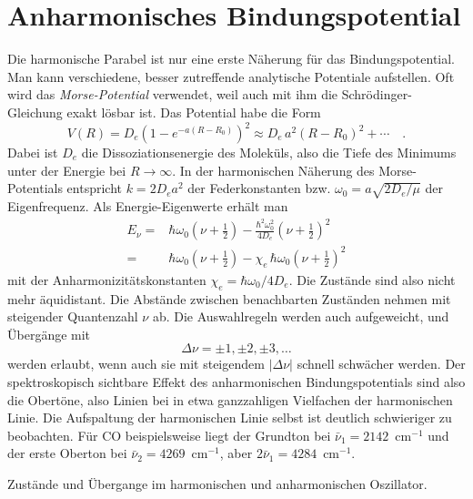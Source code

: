 \section{Anharmonisches Bindungspotential}

Die harmonische Parabel ist nur eine erste Näherung für das Bindungspotential. Man kann verschiedene, besser zutreffende analytische Potentiale aufstellen. Oft wird das \emph{Morse-Potential} verwendet, weil auch mit ihm  die Schrödinger-Gleichung exakt lösbar ist. Das Potential habe die Form
\begin{equation}
 V(R) = D_e \left( 1 - e^{-a (R - R_0)} \right)^2 \approx D_e \, a^2 (R - R_0)^2 + \cdots \quad .
\end{equation}
Dabei ist $D_e$ die Dissoziationsenergie des Moleküls, also die Tiefe des Minimums unter der Energie bei $R \rightarrow \infty$. In der harmonischen Näherung des Morse-Potentials entspricht $k = 2 D_e a^2$ der Federkonstanten bzw. $\omega_0 = a \sqrt{2 D_e / \mu}$ der Eigenfrequenz. Als Energie-Eigenwerte erhält man
\begin{align}
 E_\nu =&  \hbar \omega_0 \left( \nu  + \frac{1}{2} \right)
 - \frac{\hbar^2 \omega_0^2}{4 D_e} \left( \nu  + \frac{1}{2} \right)^2 \\
 = &
 \hbar \omega_0 \left( \nu  + \frac{1}{2} \right)
 - \chi_e \, \hbar \omega_0  \left( \nu  + \frac{1}{2} \right)^2
\end{align}
mit der Anharmonizitätskonstanten $\chi_e =\hbar \omega_0 / 4 D_e$.
Die Zustände sind also nicht mehr äquidistant. Die Abstände zwischen benachbarten Zuständen nehmen mit steigender Quantenzahl $\nu$ ab. Die Auswahlregeln werden auch aufgeweicht, und Übergänge mit 
\begin{equation}
\Delta \nu = \pm 1, \pm 2 , \pm 3, \dots
\end{equation}
werden erlaubt, wenn auch sie mit steigendem $|\Delta \nu |$ schnell schwächer werden. Der spektroskopisch sichtbare Effekt des anharmonischen Bindungspotentials sind also die Obertöne, also Linien bei in etwa ganzzahligen Vielfachen der harmonischen Linie. Die Aufspaltung der harmonischen Linie selbst ist deutlich schwieriger zu beobachten. Für CO beispielsweise liegt der Grundton bei $\bar{\nu}_1 = 2142$~cm$^{-1}$ und der erste Oberton bei 
 $\bar{\nu}_2 = 4269$~cm$^{-1}$, aber $2 \bar{\nu}_1 = 4284$~cm$^{-1}$.
 
\begin{marginfigure}
\caption{Zustände und Übergange im harmonischen und anharmonischen Oszillator.}
\end{marginfigure}
 
